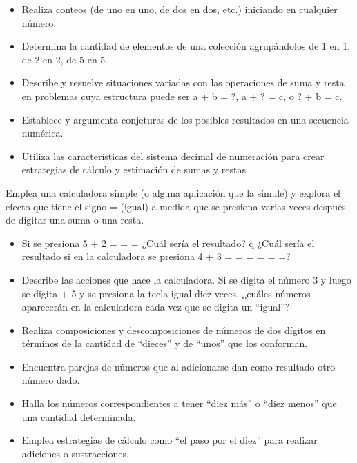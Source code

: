 
\evidencias

\begin{itemize}
  \item Realiza conteos (de uno en uno, de dos en dos, etc.) iniciando en cualquier número.
  \item Determina la cantidad de elementos de una colección agrupándolos de 1 en 1, de 2 en 2, de 5 en 5.
  \item Describe y resuelve situaciones variadas con las operaciones de suma y resta en problemas cuya estructura puede ser a + b = ?, a + ? = c, o ? + b = c.
  \item Establece y argumenta conjeturas de los posibles resultados en una secuencia numérica.
  \item Utiliza las características del sistema decimal de numeración para crear estrategias de cálculo y estimación de sumas y restas
\end{itemize}

\ejemplo

Emplea una calculadora simple (o alguna aplicación que la simule) y explora el efecto que tiene el signo = (igual) a medida que se presiona varias veces después de digitar una suma o una resta.

\begin{itemize}
  \item Si se presiona 5 + 2 = = = ¿Cuál sería el resultado? q ¿Cuál sería el resultado si en la calculadora se presiona 4 + 3 = = = = = =?
  \item Describe las acciones que hace la calculadora. Si se digita el número 3 y luego se digita + 5 y se presiona la tecla igual diez veces, ¿cuáles números aparecerán en la calculadora cada vez que se digita un “igual”?
\end{itemize}


\evidencias

\begin{itemize}
  \item Realiza composiciones y descomposiciones de números de dos dígitos en términos de la cantidad de “dieces” y de “unos” que los conforman.
  \item Encuentra parejas de números que al adicionarse dan como resultado otro número dado.
  \item Halla los números correspondientes a tener “diez más” o “diez menos” que una cantidad determinada.
  \item Emplea estrategias de cálculo como “el paso por el diez” para realizar adiciones o sustracciones.
\end{itemize}


